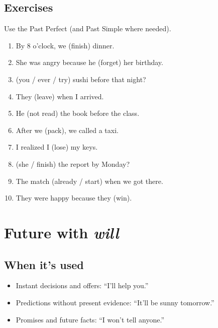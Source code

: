 \documentclass[11pt,a4paper]{article}
\begin{document}
\subsection*{Exercises}
Use the Past Perfect (and Past Simple where needed).
\begin{enumerate}
  \item By 8 o’clock, we \underline{\hspace{2.5cm}} (finish) dinner.
  \item She was angry because he \underline{\hspace{2.5cm}} (forget) her birthday.
  \item \underline{\hspace{2.5cm}} (you / ever / try) sushi before that night?
  \item They \underline{\hspace{2.5cm}} (leave) when I arrived.
  \item He \underline{\hspace{2.5cm}} (not read) the book before the class.
  \item After we \underline{\hspace{2.5cm}} (pack), we called a taxi.
  \item I realized I \underline{\hspace{2.5cm}} (lose) my keys.
  \item \underline{\hspace{2.5cm}} (she / finish) the report by Monday?
  \item The match \underline{\hspace{2.5cm}} (already / start) when we got there.
  \item They were happy because they \underline{\hspace{2.5cm}} (win).
\end{enumerate}

\section{Future with \emph{will}}
\subsection*{When it’s used}
\begin{itemize}
  \item Instant decisions and offers: ``I’ll help you.''
  \item Predictions without present evidence: ``It’ll be sunny tomorrow.''
  \item Promises and future facts: ``I won’t tell anyone.''
\end{itemize}
\end{document}

